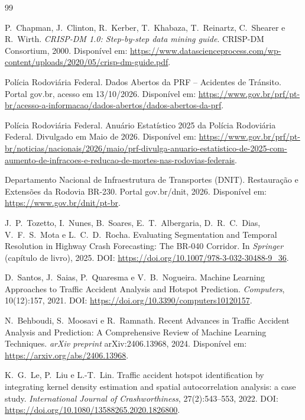 \begin{thebibliography}{99}

P.~Chapman, J.~Clinton, R.~Kerber, T.~Khabaza, T.~Reinartz, C.~Shearer e R.~Wirth.
\newblock \emph{{CRISP-DM} 1.0: Step-by-step data mining guide}.
\newblock CRISP-DM Consortium, 2000.
\newblock Dispon{\'i}vel em: \url{https://www.datascienceprocess.com/wp-content/uploads/2020/05/crisp-dm-guide.pdf}.

Pol{\'i}cia Rodovi{\'a}ria Federal.
\newblock Dados Abertos da {PRF} -- Acidentes de Tr{\'a}nsito.
\newblock Portal gov.br, acesso em 13/10/2026.
\newblock Dispon{\'i}vel em: \url{https://www.gov.br/prf/pt-br/acesso-a-informacao/dados-abertos/dados-abertos-da-prf}.

Pol{\'i}cia Rodovi{\'a}ria Federal.
\newblock Anu{\'a}rio Estat{\'i}stico 2025 da Pol{\'i}cia Rodovi{\'a}ria Federal.
\newblock Divulgado em Maio de 2026.
\newblock Dispon{\'i}vel em: \url{https://www.gov.br/prf/pt-br/noticias/nacionais/2026/maio/prf-divulga-anuario-estatistico-de-2025-com-aumento-de-infracoes-e-reducao-de-mortes-nas-rodovias-federais}.

Departamento Nacional de Infraestrutura de Transportes ({DNIT}).
\newblock Restaura{\c{c}}{\~a}o e Extens{\~o}es da Rodovia {BR-230}.
\newblock Portal gov.br/dnit, 2026.
\newblock Dispon{\'i}vel em: \url{https://www.gov.br/dnit/pt-br}.

J.~P.~Tozetto, I.~Nunes, B.~Soares, E.~T.~Albergaria, D.~R.~C.~Dias, V.~F.~S.~Mota e L.~C.~D.~Rocha.
\newblock Evaluating Segmentation and Temporal Resolution in Highway Crash Forecasting: The {BR-040} Corridor.
\newblock In \emph{Springer} (cap{\'i}tulo de livro), 2025.
\newblock DOI: \url{https://doi.org/10.1007/978-3-032-30488-9_36}.

D.~Santos, J.~Saias, P.~Quaresma e V.~B.~Nogueira.
\newblock Machine Learning Approaches to Traffic Accident Analysis and Hotspot Prediction.
\newblock \emph{Computers}, 10(12):157, 2021.
\newblock DOI: \url{https://doi.org/10.3390/computers10120157}.

N.~Behboudi, S.~Moosavi e R.~Ramnath.
\newblock Recent Advances in Traffic Accident Analysis and Prediction: A Comprehensive Review of Machine Learning Techniques.
\newblock \emph{arXiv preprint} arXiv:2406.13968, 2024.
\newblock Dispon{\'i}vel em: \url{https://arxiv.org/abs/2406.13968}.

K.~G.~Le, P.~Liu e L.-T.~Lin.
\newblock Traffic accident hotspot identification by integrating kernel density estimation and spatial autocorrelation analysis: a case study.
\newblock \emph{International Journal of Crashworthiness}, 27(2):543--553, 2022.
\newblock DOI: \url{https://doi.org/10.1080/13588265.2020.1826800}.


\end{thebibliography}
